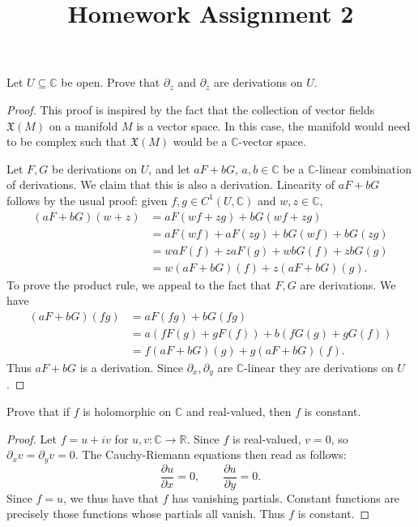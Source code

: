 \documentclass[11pt, letterpaper]{article}
\title{Homework Assignment 2}
\begin{document}
\makeproblem


\begin{problem}\label{1}
	Let $U\subseteq \mathbb{C} $ be open. Prove that $\partial _z$ and $\partial _{\overline{z} } $ are derivations on $U$.
\end{problem}
\begin{proof}
	This proof is inspired by the fact that the collection of vector fields $\mathfrak{X} (M)$ on a manifold $M$ is a vector space. In this case, the manifold would need to be complex such that $\mathfrak{X} (M)$ would be a $\mathbb{C} $-vector space.

	Let $F,G$ be derivations on $U$, and let $aF+bG$, $a,b\in\mathbb{C} $ be a $\mathbb{C} $-linear combination of derivations. We claim that this is also a derivation. Linearity of $aF+bG$ follows by the usual proof: given $f,g\in C^1(U,\mathbb{C} )$ and $w,z\in\mathbb{C} $,
	\begin{align*}
		(aF+bG)(w+z)&=aF(wf+zg)+bG(wf+zg)\\
			    &=aF(wf)+aF(zg)+bG(wf)+bG(zg)\\
			    &=waF(f)+zaF(g)+wbG(f)+zbG(g)\\
			    &=w(aF+bG)(f)+z(aF+bG)(g)
	.\end{align*}
	To prove the product rule, we appeal to the fact that $F,G$ are derivations. We have
	\begin{align*}
		(aF+bG)(fg)&=aF(fg)+bG(fg)\\
			   &=a(fF(g)+gF(f))+b(fG(g)+gG(f))\\
			   &=f(aF+bG)(g)+g(aF+bG)(f)
	.\end{align*}
	Thus $aF+bG$ is a derivation. Since $\partial _x,\partial _y$ are $\mathbb{C} $-linear they are derivations on $U $.
\end{proof}

\begin{problem}
	Prove that if $f$ is holomorphic on $\mathbb{C} $ and real-valued, then $f$ is constant.
\end{problem}
\begin{proof}
	Let $f=u+iv$ for $u,v : \mathbb{C}  \to \mathbb{R} $. Since $f$ is real-valued, $v=0$, so $\partial _xv=\partial _yv=0$. The Cauchy-Riemann equations then read as follows:
	\[
		\frac{\partial u}{\partial x} =0,\qquad \frac{\partial u}{\partial y} =0
	.\]
	Since $f=u$, we thus have that $f$ has vanishing partials. Constant functions are precisely those functions whose partials all vanish. Thus $f$ is constant.
\end{proof}
\end{document}
